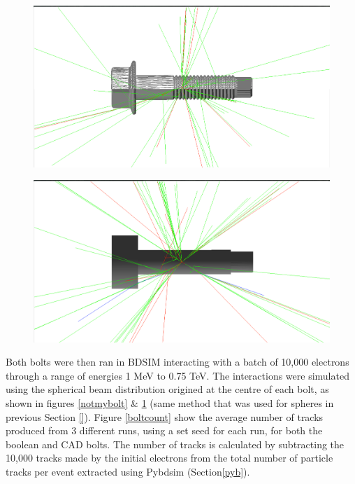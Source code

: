 \documentclass[12pt,a4paper]{article}
\begin{document}
\begin{figure}[h!]
\centering
\begin{minipage}{.5\textwidth}
  \centering
  \includegraphics[height=.5\linewidth]{Images//CAD_Screw//Screw_hnh_10MeVe.png}
  \label{notmybolt}
\end{minipage}%
\begin{minipage}{.5\textwidth}
  \centering
  \includegraphics[height=.5\linewidth]{Images//CAD_Screw//bensboltinbdsim.png}
  \label{mybolt}
\end{minipage}%
\end{figure}

\noindent Both bolts were then ran in BDSIM interacting with a batch of 10,000 electrons through a range of energies 1 MeV to 0.75 TeV. The interactions were simulated using the spherical beam distribution origined at the centre of each bolt, as shown in figures \ref{notmybolt} \& \ref{mybolt} (same method that was used for spheres in previous Section \ref{}). Figure \ref{boltcount} show the average number of tracks produced from 3 different runs, using a set seed for each run, for both the boolean and CAD bolts. The number of tracks is calculated by subtracting the 10,000 tracks made by the initial electrons from the total number of particle tracks per event extracted using Pybdsim (Section\ref{pyb}).
\end{document}
